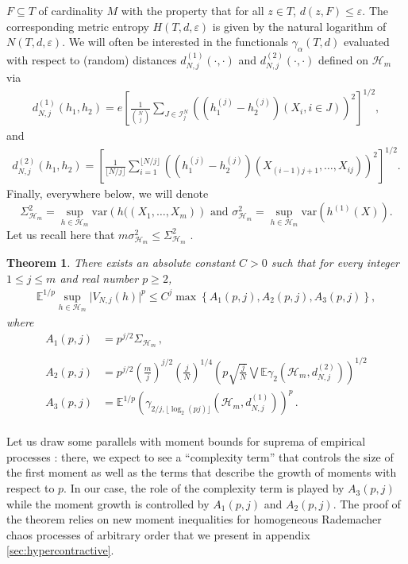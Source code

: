 \documentclass[12pt]{article}
\newcommand\var{\mathrm{var}}
\newcommand{\eps}{\varepsilon}
\def\l{\left}
\def\r{\right}
\newcommand{\m}{\mathcal}
\newcommand{\mb}{\mathbb}
\newtheorem{theorem}{Theorem}%
\theoremstyle{thmstyletwo}%
\theoremstyle{thmstylethree}%
\begin{document}
$F\subseteq T$ of cardinality $M$ with the property that for all $z\in T$, $d(z,F)\leq \eps$. The corresponding metric entropy $H(T,d,\eps)$ is given by the natural logarithm of $N(T,d,\eps)$. 
We will often be interested in the functionals $\gamma_\alpha(T,d)$ evaluated with respect to (random) distances $d^{(1)}_{N,j}(\cdot,\cdot)$ and $d^{(2)}_{N,j}(\cdot,\cdot)$ defined on $\m H_m$ via
    \begin{align}\label{eq:d_N}
        d^{(1)}_{N,j}(h_1, h_2) = e \l[\frac{1}{{N \choose j}}\sum_{J \in \mathcal{I}^N_j} \l(\l(h^{(j)}_1 - h^{(j)}_2 \r)\l(X_i, i \in J\r)\r)^2\r]^{1/2},
    \end{align}
    and
    \begin{align}\label{eq:d_Nj}
        d^{(2)}_{N,j}(h_1, h_2) = \l[\frac{1}{\lfloor N/j \rfloor} \sum_{i=1}^{\lfloor N/j \rfloor} \l(\l(h_1^{(j)} - h_2^{(j)}\r)\l(X_{(i-1)j + 1} , \ldots , X_{ij}\r)\r)^2 \r]^{1/2}.
    \end{align}
Finally, everywhere below, we will denote 
\[
\Sigma^2_{\m H_m} = \sup_{h \in \mathcal{H}_m}\var\l(h((X_1,\ldots,X_m)\r) \text{ and } \sigma^2_{\m H_m}=\sup_{h \in \mathcal{H}_m} \var(h^{(1)}(X)).
\]
Let us recall here that $m\sigma^2_{\m H_m}\leq \Sigma^2_{\m H_m}$ \citep[see][]{lee2019u}.
\begin{theorem}
\label{thm: thm2}
   There exists an absolute constant $C>0$ such that for every integer $1\leq j \leq m$ and real number $p \geq 2$,
    \begin{align*}
    \mb E^{1/p} \sup_{h \in \mathcal{H}_m} \lvert V_{N,j}(h) \rvert^p  \leq C^j\max\l\{A_1(p,j), A_2(p,j), A_3(p,j)\r\},  
\end{align*}
where
\begin{align*}
    A_1(p,j) &=  p^{j/2} \Sigma_{\m H_m} \,, 
    \\
    \\
    A_2(p,j) &= p^{j/2}\l(\frac{m}{j}\r)^{j/2}\l(\frac{j}{N}\r)^{1/4} \l( p\sqrt{\frac{j}{N}}\bigvee \mb E \gamma_2 (\mathcal{H}_m, d^{(2)}_{N,j})\r)^{1/2}
    \\
    A_3(p,j) & =  \mb E^{1/p} \l(\gamma_{2/j, \lfloor \log_2 (pj)\rfloor}\l(\mathcal{H}_m, d^{(1)}_{N,j}\r) \r)^p  \,.\\
\end{align*}
\end{theorem}
Let us draw some parallels with moment bounds for suprema of empirical processes \citep[Theorem 12]{boucheron2005moment}: there, we expect to see a ``complexity term'' that controls the size of the first moment as well as the terms that describe the growth of moments with respect to $p$. In our case, the role of the complexity term is played by $A_3(p,j)$ while the moment growth is controlled by $A_1(p,j)$ and $A_2(p,j)$. 
The proof of the theorem relies on new moment inequalities for homogeneous Rademacher chaos processes of arbitrary order that we present in appendix \ref{sec:hypercontractive}.
\end{document}
